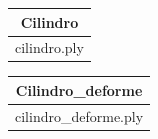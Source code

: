\documentclass{article}
\begin{document}
\begin{table}[h!]
	\centering
	\label{11}
	\begin{tabular}{|c|}
		\hline
		\textbf{Cilindro}\\ \hline
		cilindro.ply\\ \hline
	\end{tabular}
\end{table}


\begin{table}[h!]
	\centering
	\label{12}
	\begin{tabular}{|c|}
		\hline
		\textbf{Cilindro\_deforme}\\ \hline
		cilindro\_deforme.ply\\ \hline
	\end{tabular}
\end{table}
\end{document}
